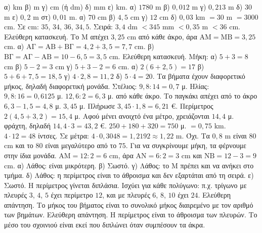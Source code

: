  α) km \quad β) m \quad γ) cm (ή dm) \quad δ) mm \quad ε) km.
 α) $1780$ m \quad β) $0{,}012$ m \quad γ) $0{,}213$ m \quad δ) $30$ m \quad ε) $0{,}2$ m \quad στ) $0{,}01$ m.
 α) $70$ cm \quad β) $4{,}5$ cm \quad γ) $12$ cm \quad δ) $0{,}03$ km $=30$ m $=3000$ cm.
 Σε cm: $35$, $34$, $36$, $34{,}5$. Σειρά: $3{,}4$ dm $<345$ mm $<0{,}35$ m $<36$ cm.
 Ελεύθερη κατασκευή. Το $\mathrm{Μ}$ απέχει $3{,}25$ cm από κάθε άκρο, άρα $\mathrm{ΑΜ}=\mathrm{ΜΒ}=3{,}25$ cm.
 α) $\mathrm{ΑΓ}=\mathrm{ΑΒ}+\mathrm{ΒΓ}=4{,}2+3{,}5=7{,}7$ cm. β) $\mathrm{ΒΓ}=\mathrm{ΑΓ}-\mathrm{ΑΒ}=10-6{,}5=3{,}5$ cm.
 Ελεύθερη κατασκευή. Μήκη: α) $5+3=8$ cm \quad β) $5-2=3$ cm \quad γ) $5+3-2=6$ cm.
 α) $2(6+2{,}5)=17$ \quad β) $5+6+7{,}5=18{,}5$ \quad γ) $4\cdot2{,}8=11{,}2$ \quad δ) $5\cdot4=20$.
 Τα βήματα έχουν διαφορετικό μήκος, δηλαδή διαφορετική μονάδα. Στέλιος: $9{,}8:14=0{,}7$ μ. Ηλίας: $9{,}8:16=0{,}6125$ μ.
 $12{,}6:2=6{,}3$ μ. από κάθε άκρο. Το παγκάκι απέχει από το άκρο $6{,}3-1{,}5=4{,}8$ μ.
 $3{,}45$ μ. Πλήρωσε $3{,}45\cdot1{,}8=6{,}21$ €.
 Περίμετρος $2(4{,}5+3{,}2)=15{,}4$ μ. Αφού μένει ανοιχτό ένα μέτρο, χρειάζονται $14{,}4$ μ. φράχτη, δηλαδή $14{,}4\cdot3=43{,}2$ €.
 $250+180+320=750$ μ. $=0{,}75$ km.
 $4\cdot12=48$ ίντσες. Σε μέτρα: $4\cdot0{,}3048=1{,}2192\approx1{,}22$ m.
 Όχι. Τα $0{,}8$ m είναι $80$ cm και το $80$ είναι μεγαλύτερο από το $75$. Για να συγκρίνουμε μήκη, τα φέρνουμε στην ίδια μονάδα.
 $\mathrm{ΑΜ}=12:2=6$ cm, άρα $\mathrm{ΑΝ}=6:2=3$ cm και $\mathrm{ΝΒ}=12-3=9$ cm.
 α) Λάθος: είναι μικρότερη. β) Σωστό. γ) Λάθος: το $\mathrm{Μ}$ πρέπει και να ανήκει στο τμήμα. δ) Λάθος: η περίμετρος είναι το άθροισμα και δεν εξαρτάται από τη σειρά. ε) Σωστό.
 Η περίμετρος γίνεται διπλάσια. Ισχύει για κάθε πολύγωνο: π.χ. τρίγωνο με πλευρές $3$, $4$, $5$ έχει περίμετρο $12$, και με πλευρές $6$, $8$, $10$ έχει $24$.
 Ελεύθερη απάντηση. Το μήκος του βήματος είναι το συνολικό μήκος διαιρεμένο με τον αριθμό των βημάτων.
 Ελεύθερη απάντηση. Η περίμετρος είναι το άθροισμα των πλευρών. Το μέσο του σχοινιού είναι εκεί που διπλώνει όταν συμπέσουν τα άκρα.
